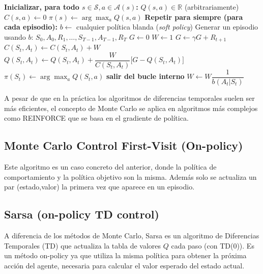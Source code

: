 \begin{algorithm}
\caption{Control de Monte Carlo (off-policy)}\label{algo:mc_off_policy}
\begin{algorithmic}[1]
\State \textbf{Inicializar, para todo $s \in \mathcal{S}, a \in \mathcal{A}(s)$:}
    \State $Q(s, a) \in \mathbb{R}$ (arbitrariamente)
    \State $C(s, a) \gets 0$
    \State $\pi(s) \gets \arg\max_a Q(s, a)$ 
\State \textbf{Repetir para siempre (para cada episodio):}
    \State $b \gets$ cualquier política blanda (\textit{soft policy})
    \State Generar un episodio usando $b$: $S_0, A_0, R_1, \dots, S_{T-1}, A_{T-1}, R_T$
    \State $G \gets 0$
    \State $W \gets 1$
        \State $G \gets \gamma G + R_{t+1}$
        \State $C(S_t, A_t) \gets C(S_t, A_t) + W$
        \State $Q(S_t, A_t) \gets Q(S_t, A_t) + \dfrac{W}{C(S_t, A_t)} \bigl[ G - Q(S_t, A_t) \bigr]$
        \State $\pi(S_t) \gets \arg\max_a Q(S_t, a)$ 
            \State \textbf{salir del bucle interno} 
        \EndIf
        \State $W \gets W \dfrac{1}{b(A_t|S_t)}$
    \EndFor
\end{algorithmic}
\end{algorithm}

A pesar de que en la práctica los algoritmos de diferencias temporales suelen ser más eficientes, el concepto de Monte Carlo se aplica en algoritmos más complejos como REINFORCE que se basa en el gradiente de política.

\subsection*{Monte Carlo Control First-Visit (On-policy)}
Este algoritmo es un caso concreto del anterior, donde la política de comportamiento y la política objetivo son la misma. Además solo se actualiza un par (estado,valor) la primera vez que aparece en un episodio.

\subsection*{Sarsa (on-policy TD control)}
A diferencia de los métodos de Monte Carlo, Sarsa es un algoritmo de Diferencias Temporales (TD) que actualiza la tabla de valores $Q$ cada paso (con TD(0)). Es un método on-policy ya que utiliza la misma política para obtener la próxima acción del agente, necesaria para calcular el valor esperado del estado actual.

